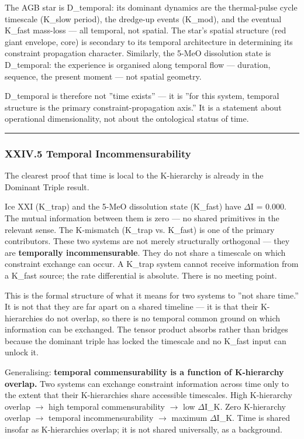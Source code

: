 \documentclass[12pt,a4paper]{article}
\begin{document}
The AGB star is D\_temporal: its dominant dynamics are the thermal-pulse cycle timescale (K\_slow period), the dredge-up events (K\_mod), and the eventual K\_fast mass-loss --- all temporal, not spatial. The star's spatial structure (red giant envelope, core) is secondary to its temporal architecture in determining its constraint propagation character. Similarly, the 5-MeO dissolution state is D\_temporal: the experience is organised along temporal flow --- duration, sequence, the present moment --- not spatial geometry.

D\_temporal is therefore not ''time exists'' --- it is ''for this system, temporal structure is the primary constraint-propagation axis.'' It is a statement about operational dimensionality, not about the ontological status of time.

\begin{center}
\rule{0.5\textwidth}{0.4pt}
\end{center}

\subsubsection{XXIV.5 Temporal Incommensurability}

The clearest proof that time is local to the K-hierarchy is already in the Dominant Triple result.

Ice XXI (K\_trap) and the 5-MeO dissolution state (K\_fast) have $\Delta$I = 0.000. The mutual information between them is zero --- no shared primitives in the relevant sense. The K-mismatch (K\_trap vs. K\_fast) is one of the primary contributors. These two systems are not merely structurally orthogonal --- they are \textbf{temporally incommensurable}. They do not share a timescale on which constraint exchange can occur. A K\_trap system cannot receive information from a K\_fast source; the rate differential is absolute. There is no meeting point.

This is the formal structure of what it means for two systems to ''not share time.'' It is not that they are far apart on a shared timeline --- it is that their K-hierarchies do not overlap, so there is no temporal common ground on which information can be exchanged. The tensor product absorbs rather than bridges because the dominant triple has locked the timescale and no K\_fast input can unlock it.

Generalising: \textbf{temporal commensurability is a function of K-hierarchy overlap.} Two systems can exchange constraint information across time only to the extent that their K-hierarchies share accessible timescales. High K-hierarchy overlap $\rightarrow$ high temporal commensurability $\rightarrow$ low $\Delta$I\_K. Zero K-hierarchy overlap $\rightarrow$ temporal incommensurability $\rightarrow$ maximum $\Delta$I\_K. Time is shared insofar as K-hierarchies overlap; it is not shared universally, as a background.
\end{document}
